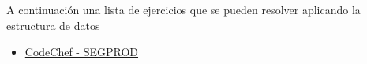 A continuación una lista de ejercicios que se pueden resolver aplicando la estructura de datos 
\begin{itemize}
	\item \href{https://www.codechef.com/NOV17/problems/SEGPROD}{CodeChef - SEGPROD}
\end{itemize} 